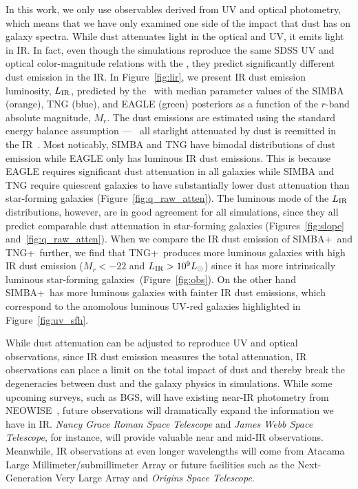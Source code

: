 In this work, we only use observables derived from UV and optical
photometry, which means that we have only examined one side of the impact
that dust has on galaxy spectra.
While dust attenuates light in the optical and UV, it emits light in
IR. In fact, even though the simulations reproduce the same SDSS UV and
optical color-magnitude relations with the \eda, they predict significantly 
different dust emission in the IR. 
In Figure~\ref{fig:lir}, we present IR dust emission luminosity, $L_{\rm
IR}$, predicted by the \eda~with median parameter values of the SIMBA 
(orange), TNG (blue), and EAGLE (green) posteriors as a function of the
$r$-band absolute magnitude, $M_r$.
The dust emissions are estimated using the standard energy balance assumption
--- \ie~all starlight attenuated by dust is reemitted in the IR~\citep{dacunha2008}. 
Most noticably, SIMBA and TNG have bimodal distributions of dust emission
while EAGLE only has luminous IR dust emissions. 
This is because EAGLE requires significant dust attenuation in all
galaxies while SIMBA and TNG require quiescent galaxies to have
substantially lower dust attenuation than star-forming galaxies
(Figure~\ref{fig:q_raw_atten}). 
The luminous mode of the $L_{\rm IR}$ distributions, however, are in good
agreement for all simulations, since they all predict comparable dust
attenuation in star-forming galaxies
(Figures~\ref{fig:slope} and~\ref{fig:q_raw_atten}). 
When we compare the IR dust emission of SIMBA+\eda~and TNG+\eda~further, we
find that TNG+\eda~produces more luminous galaxies with high IR dust
emission ($M_r < -22$ and $L_{\rm IR} > 10^9L_\odot$) since it has more
intrinsically luminous star-forming galaxies~(Figure~\ref{fig:obs}).
On the other hand SIMBA+\eda~has more luminous galaxies with fainter IR
dust emissions, which correspond to the anomolous luminous UV-red galaxies
highlighted in Figure~\ref{fig:uv_sfh}.

While dust attenuation can be adjusted to reproduce UV and optical
observations, since IR dust emission measures the total attenuation, IR
observations can place a limit on the total impact of dust and thereby
break the degeneracies between dust and the galaxy physics in simulations.
While some upcoming surveys, such as BGS, will have existing near-IR
photometry from NEOWISE~\citep{meisner2018}, future observations will
dramatically expand the information we have in IR.
\emph{Nancy Grace Roman Space Telescope} and \emph{James Webb Space
Telescope}, for instance, will provide valuable near and
mid-IR observations. 
Meanwhile, IR observations at even longer wavelengths will come from
Atacama Large Millimeter/submillimeter Array or future facilities
such as the Next-Generation Very Large Array and \emph{Origins Space Telescope}.

